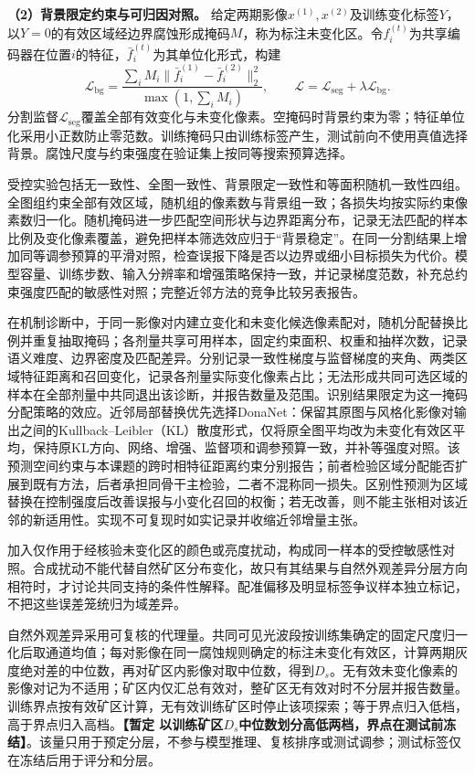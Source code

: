 \textbf{（2）背景限定约束与可归因对照。}
给定两期影像$x^{(1)},x^{(2)}$及训练变化标签$Y$，以$Y=0$的有效区域经边界腐蚀形成掩码$M$，称为标注未变化区。令$f^{(t)}_i$为共享编码器在位置$i$的特征，$\bar f^{(t)}_i$为其单位化形式，构建
\begin{equation}
\mathcal{L}_{\mathrm{bg}}=\frac{\sum_i M_i\|\bar f_i^{(1)}-\bar f_i^{(2)}\|_2^2}{\max(1,\sum_i M_i)},\qquad
\mathcal{L}=\mathcal{L}_{\mathrm{seg}}+\lambda\mathcal{L}_{\mathrm{bg}}.
\end{equation}
分割监督$\mathcal{L}_{\mathrm{seg}}$覆盖全部有效变化与未变化像素。空掩码时背景约束为零；特征单位化采用小正数防止零范数。训练掩码只由训练标签产生，测试前向不使用真值选择背景。腐蚀尺度与约束强度在验证集上按同等搜索预算选择。

受控实验包括无一致性、全图一致性、背景限定一致性和等面积随机一致性四组。全图组约束全部有效区域，随机组的像素数与背景组一致；各损失均按实际约束像素数归一化。随机掩码进一步匹配空间形状与边界距离分布，记录无法匹配的样本比例及变化像素覆盖，避免把样本筛选效应归于“背景稳定”。在同一分割结果上增加同等调参预算的平滑对照，检查误报下降是否以边界或细小目标损失为代价。模型容量、训练步数、输入分辨率和增强策略保持一致，并记录梯度范数，补充总约束强度匹配的敏感性对照；完整近邻方法的竞争比较另表报告。

在机制诊断中，于同一影像对内建立变化和未变化候选像素配对，随机分配替换比例并重复抽取掩码；各剂量共享可用样本，固定约束面积、权重和抽样次数，记录语义难度、边界密度及匹配差异。分别记录一致性梯度与监督梯度的夹角、两类区域特征距离和召回变化，记录各剂量实际变化像素占比；无法形成共同可选区域的样本在全部剂量中共同退出该诊断，并报告数量及范围。识别结果限定为这一掩码分配策略的效应。近邻局部替换优先选择DonaNet：保留其原图与风格化影像对输出之间的Kullback--Leibler（KL）散度形式，仅将原全图平均改为未变化有效区平均，保持原KL方向、网络、增强、监督项和调参预算一致，并补等强度对照。该预测空间约束与本课题的跨时相特征距离约束分别报告；前者检验区域分配能否扩展到既有方法，后者承担同骨干主检验，二者不混称同一损失。区别性预测为区域替换在控制强度后改善误报与小变化召回的权衡；若无改善，则不能主张相对该近邻的新适用性。实现不可复现时如实记录并收缩近邻增量主张。

加入仅作用于经核验未变化区的颜色或亮度扰动，构成同一样本的受控敏感性对照。合成扰动不能代替自然矿区分布变化，故只有其结果与自然外观差异分层方向相符时，才讨论共同支持的条件性解释。配准偏移及明显标签争议样本独立标记，不把这些误差笼统归为域差异。

自然外观差异采用可复核的代理量。共同可见光波段按训练集确定的固定尺度归一化后取通道均值；每对影像在同一腐蚀规则确定的标注未变化有效区，计算两期灰度绝对差的中位数，再对矿区内影像对取中位数，得到$D_s$。无有效未变化像素的影像对记为不适用；矿区内仅汇总有效对，整矿区无有效对时不分层并报告数量。训练界点按有效矿区计算，无有效训练矿区时停止该项探索；等于界点归入低档，高于界点归入高档。\textbf{【暂定 以训练矿区$D_s$中位数划分高低两档，界点在测试前冻结】}。该量只用于预定分层，不参与模型推理、复核排序或测试调参；测试标签仅在冻结后用于评分和分层。

